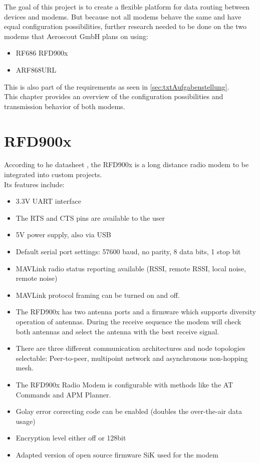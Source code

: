 %
\label{ch:txtModems}
The goal of this project is to create a flexible platform for data routing between devices and modems. But because not all modems behave the same and have equal configuration possibilities, further research needed to be done on the two modems that Aeroscout GmbH plans on using:
\begin{itemize}
    \item RF686 RFD900x
    \item ARF868URL
\end{itemize}
This is also part of the requirements as seen in \autoref{sec:txtAufgabenstellung}.\\
This chapter provides an overview of the configuration possibilities and transmission behavior of both modems.
%
%
%
%
\section{RFD900x}%
According to he datasheet \cite{RFD900x_Datasheet}, the RFD900x is a long distance radio modem to be integrated into custom projects.\\
Its features include: \begin{itemize}
    \item 3.3V UART interface
    \item The RTS and CTS pins are available to the user
    \item 5V power supply, also via USB
    \item Default serial port settings: 57600 baud, no parity, 8 data bits, 1 stop bit
    \item MAVLink radio status reporting available (RSSI, remote RSSI, local noise, remote noise)
    \item MAVLink protocol framing can be turned on and off.
    \item The RFD900x has two antenna ports and a firmware which supports diversity operation of antennas. During the receive sequence the modem will check both antennas and select the antenna with the best receive signal.
    \item There are three different communication architectures and node topologies selectable: Peer-to-peer, multipoint network and asynchronous non-hopping mesh.
    \item The RFD900x Radio Modem is configurable with methods like the AT Commands and APM Planner.
    \item Golay error correcting code can be enabled (doubles the over-the-air data usage)
    \item Encryption level either off or 128bit 
    \item Adapted version of open source firmware SiK used for the modem
\end{itemize}
%
%
